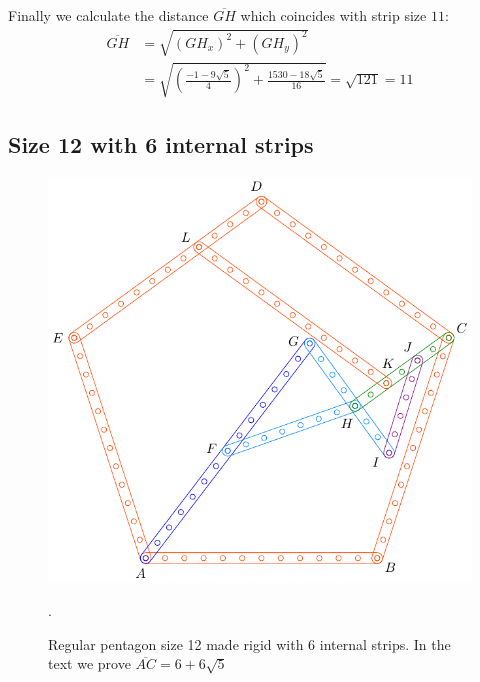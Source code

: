 \documentclass[11pt]{article}
\begin{document}
Finally we calculate the distance $\overline{GH}$ which coincides with strip size $11$:
\begin{align}
\overline{GH} &= \sqrt{(GH_x)^2 + (GH_y)^2}\nonumber\\
 &= \sqrt{\left(\frac{-1-9\sqrt5}{4}\right)^2 + \frac{1530-18\sqrt5}{16}}%
 = \sqrt{121} = 11
\end{align}

\subsection{Size 12 with 6 internal strips}

\begin{figure}[h]
 \centering
 \includegraphics[scale=0.8]{12/penta12-6a}
 \caption{Regular pentagon size 12 made rigid with 6 internal strips. In the text we prove $\overline{AC} = 6 + 6\sqrt5$}.
 \label{fig:penta12-6a}
\end{figure}
\end{document}

